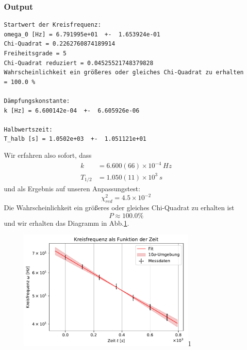 \documentclass[a4paper,10pt]{article}
\begin{document}
\subsubsection{Output}
\begin{lstlisting}
Startwert der Kreisfrequenz: 
omega_0 [Hz] = 6.791995e+01  +-  1.653924e-01
Chi-Quadrat = 0.2262760874189914
Freiheitsgrade = 5
Chi-Quadrat reduziert = 0.04525521748379828
Wahrscheinlichkeit ein größeres oder gleiches Chi-Quadrat zu erhalten = 100.0 %

Dämpfungskonstante: 
k [Hz] = 6.600142e-04  +-  6.605926e-06

Halbwertszeit: 
T_halb [s] = 1.0502e+03  +-  1.051121e+01
\end{lstlisting}
Wir erfahren also sofort, dass
\begin{align*}
k&=6.600(66)\times10^{-4}\: Hz\\
T_{1/2}&=1.050(11)\times10^{3}\:s
\end{align*}
und als Ergebnis auf unseren Anpassungstest:
\[\chi^{2}_{red}=4.5\times10^{-2}\]
Die Wahrscheinlichkeit ein größeres oder gleiches Chi-Quadrat zu erhalten ist
 \[P\approx  100.0 \%\]
und wir erhalten das Diagramm in Abb.\ref{fig:Fig1}.
\begin{figure}[htb]
  \centering
  \begin{annotate}{\includegraphics[width=0.8\textwidth]{213_Fig1.pdf}}{1}
  \end{annotate}
\caption{}
\label{fig:Fig1}
\end{figure}
\end{document}
